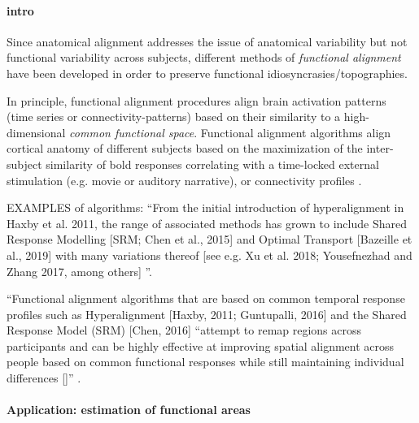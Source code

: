 

\paragraph{intro}


Since anatomical alignment addresses the issue of anatomical variability but not
functional variability across subjects, different methods of \textit{functional
alignment} have been developed in order to preserve functional
idiosyncrasies/topographies.

In principle, functional alignment procedures align brain activation patterns
(time series or connectivity-patterns) based on their similarity to a
high-dimensional \textit{common functional space}.
%
Functional alignment algorithms align cortical anatomy of different subjects
based on the maximization of the inter-subject similarity of \ac{bold} responses
\citep{haxby2011common, chen2015reduced, sabuncu2010function} correlating with a
time-locked external stimulation (e.g. movie or auditory narrative), or
connectivity profiles \citep{feilong2018reliable, guntupalli2018computational}.

EXAMPLES of algorithms: ``From the initial introduction of hyperalignment in
Haxby et al.  2011, the range of associated methods has grown to include Shared
Response Modelling [SRM; Chen et al., 2015] and Optimal Transport [Bazeille et
al., 2019] with many variations thereof [see e.g. Xu et al. 2018; Yousefnezhad
and Zhang 2017, among others] \citep{bazeille2021empirical}''.

%
``Functional alignment algorithms that are based on common temporal response
profiles such as Hyperalignment [Haxby, 2011; Guntupalli, 2016] and the Shared
Response Model (SRM) [Chen, 2016] ``attempt to remap regions across participants
and can be highly effective at improving spatial alignment across people based
on common functional responses while still maintaining individual differences
[\citep{feilong2018reliable}]'' \citep{chang2021endogenous}.


\paragraph{Application: estimation of functional areas}


